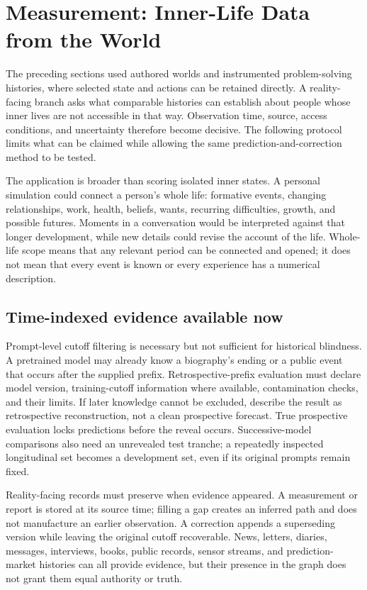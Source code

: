 \documentclass[10pt]{article}
\begin{document}
\section{Measurement: Inner-Life Data from the World}
\label{sec:measurement}

The preceding sections used authored worlds and instrumented problem-solving
histories, where selected state and actions can be retained directly. A
reality-facing branch asks what comparable histories can establish about
people whose inner lives are not accessible in that way. Observation time,
source, access conditions, and uncertainty therefore become decisive. The
following protocol limits what can be claimed while allowing the same
prediction-and-correction method to be tested.

The application is broader than scoring isolated inner states. A personal
simulation could connect a person's whole life: formative events, changing
relationships, work, health, beliefs, wants, recurring difficulties, growth,
and possible futures. Moments in a conversation would be interpreted against
that longer development, while new details could revise the account of the
life. Whole-life scope means that any relevant period can be connected and
opened; it does not mean that every event is known or every experience has a
numerical description.

\subsection{Time-indexed evidence available now}

Prompt-level cutoff filtering is necessary but not sufficient for historical
blindness. A pretrained model may already know a biography's ending or a
public event that occurs after the supplied prefix. Retrospective-prefix
evaluation must declare model version, training-cutoff information where
available, contamination checks, and their limits. If later knowledge cannot
be excluded, describe the result as retrospective reconstruction, not a clean
prospective forecast. True prospective evaluation locks predictions before
the reveal occurs. Successive-model comparisons also need an unrevealed test
tranche; a repeatedly inspected longitudinal set becomes a development set,
even if its original prompts remain fixed.

Reality-facing records must preserve when evidence appeared. A measurement or
report is stored at its source time; filling a gap creates an inferred path and
does not manufacture an earlier observation. A correction appends a
superseding version while leaving the original cutoff recoverable. News,
letters, diaries, messages, interviews, books, public records, sensor streams,
and prediction-market histories can all provide evidence, but their presence in
the graph does not grant them equal authority or truth.
\end{document}
